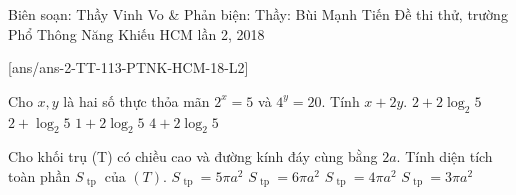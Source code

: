 \begin{name}
{Biên soạn: Thầy Vinh Vo \& Phản biện: Thầy: Bùi Mạnh Tiến }
{Đề thi thử, trường Phổ Thông Năng Khiếu HCM lần 2, 2018}
\end{name}
\setcounter{ex}{0}
[ans/ans-2-TT-113-PTNK-HCM-18-L2]

\begin{ex}%
Cho $ x, y  $ là hai số thực thỏa mãn $ 2^x = 5 $ và $ 4^y = 20 $. Tính $ x + 2y $.	
	\choice
	{\True $ 2 + 2 \log_2 5 $}
	{$ 2 + \log_2 5 $}
	{$ 1 + 2 \log_2 5 $}
	{$ 4 + 2 \log_2 5 $}
\end{ex}
\begin{ex}%
Cho khối trụ (T) có chiều cao và đường kính đáy cùng bằng $ 2a $. Tính diện tích toàn phần $ S_{ \text{ tp } } $ của $ (T) $.	
	\choice
	{$ S_{ \text{ tp } }  = 5 \pi a^2 $}
	{\True $ S_{ \text{ tp } }  = 6 \pi a^2 $}
	{$ S_{ \text{ tp } }  = 4 \pi a^2 $}
	{$ S_{ \text{ tp } }  = 3 \pi a^2 $}
\end{ex}	

